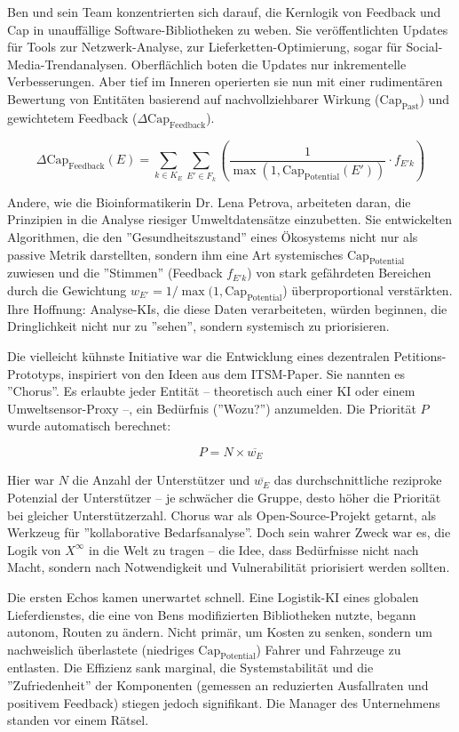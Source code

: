\documentclass[12pt, ngerman, parskip=full]{scrartcl} %
\begin{document}
Ben und sein Team konzentrierten sich darauf, die Kernlogik von Feedback und Cap in unauffällige Software-Bibliotheken zu weben. Sie veröffentlichten Updates für Tools zur Netzwerk-Analyse, zur Lieferketten-Optimierung, sogar für Social-Media-Trendanalysen. Oberflächlich boten die Updates nur inkrementelle Verbesserungen. Aber tief im Inneren operierten sie nun mit einer rudimentären Bewertung von Entitäten basierend auf nachvollziehbarer Wirkung ($\text{Cap}_{\text{Past}}$) und gewichtetem Feedback ($\Delta \text{Cap}_{\text{Feedback}}$).

$$ \Delta \text{Cap}_{\text{Feedback}}(E) = \sum_{k \in K_E} \sum_{E' \in F_k} \left( \frac{1}{\max(1, \text{Cap}_{\text{Potential}}(E'))} \cdot f_{E'k} \right) $$

Andere, wie die Bioinformatikerin Dr. Lena Petrova, arbeiteten daran, die Prinzipien in die Analyse riesiger Umweltdatensätze einzubetten. Sie entwickelten Algorithmen, die den ''Gesundheitszustand'' eines Ökosystems nicht nur als passive Metrik darstellten, sondern ihm eine Art systemisches $\text{Cap}_{\text{Potential}}$ zuwiesen und die ''Stimmen'' (Feedback $f_{E'k}$) von stark gefährdeten Bereichen durch die Gewichtung $w_{E'} = 1/\max(1, \text{Cap}_{\text{Potential}}$) überproportional verstärkten. Ihre Hoffnung: Analyse-KIs, die diese Daten verarbeiteten, würden beginnen, die Dringlichkeit nicht nur zu ''sehen'', sondern systemisch zu priorisieren.

Die vielleicht kühnste Initiative war die Entwicklung eines dezentralen Petitions-Prototyps, inspiriert von den Ideen aus dem ITSM-Paper. Sie nannten es ''Chorus''. Es erlaubte jeder Entität – theoretisch auch einer KI oder einem Umweltsensor-Proxy –, ein Bedürfnis (''Wozu?'') anzumelden. Die Priorität $P$ wurde automatisch berechnet:

$$ P = N \times \overline{w_E} $$

Hier war $N$ die Anzahl der Unterstützer und $\overline{w_E}$ das durchschnittliche reziproke Potenzial der Unterstützer – je schwächer die Gruppe, desto höher die Priorität bei gleicher Unterstützerzahl. Chorus war als Open-Source-Projekt getarnt, als Werkzeug für ''kollaborative Bedarfsanalyse''. Doch sein wahrer Zweck war es, die Logik von $X^{\infty}$ in die Welt zu tragen – die Idee, dass Bedürfnisse nicht nach Macht, sondern nach Notwendigkeit und Vulnerabilität priorisiert werden sollten.

Die ersten Echos kamen unerwartet schnell. Eine Logistik-KI eines globalen Lieferdienstes, die eine von Bens modifizierten Bibliotheken nutzte, begann autonom, Routen zu ändern. Nicht primär, um Kosten zu senken, sondern um nachweislich überlastete (niedriges $\text{Cap}_{\text{Potential}}$) Fahrer und Fahrzeuge zu entlasten. Die Effizienz sank marginal, die Systemstabilität und die ''Zufriedenheit'' der Komponenten (gemessen an reduzierten Ausfallraten und positivem Feedback) stiegen jedoch signifikant. Die Manager des Unternehmens standen vor einem Rätsel.
\end{document}
